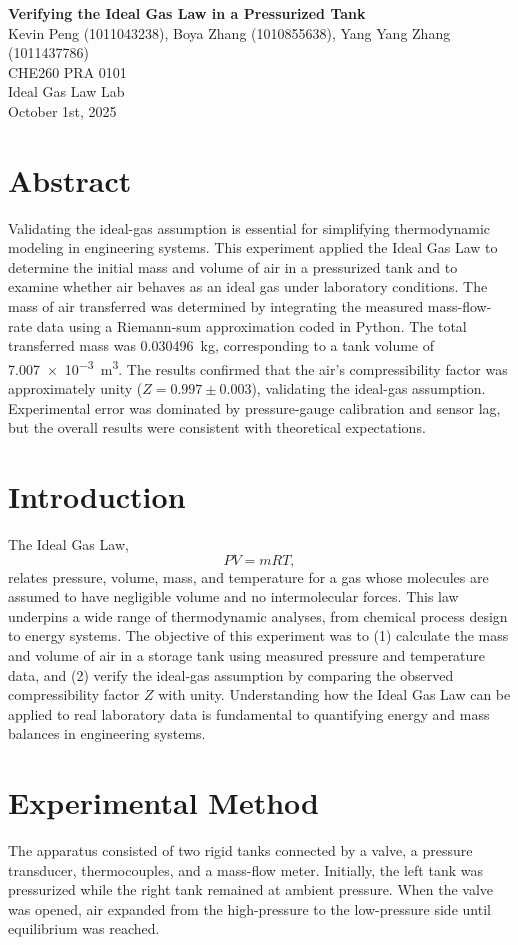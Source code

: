 \documentclass[12pt]{article}
\begin{document}
\begin{center}
\textbf{\Large Verifying the Ideal Gas Law in a Pressurized Tank} \\[0.5em]
Kevin Peng (1011043238), Boya Zhang (1010855638), Yang Yang Zhang (1011437786)\\[0.5em]
CHE260 PRA 0101 \\
Ideal Gas Law Lab \\
October 1st, 2025 \\
\end{center}

\section*{Abstract}
Validating the ideal-gas assumption is essential for simplifying thermodynamic modeling in engineering systems.
This experiment applied the Ideal Gas Law to determine the initial mass and volume of air in a pressurized tank and to examine whether air behaves as an ideal gas under laboratory conditions. The mass of air transferred was determined by integrating the measured mass-flow-rate data using a Riemann-sum approximation coded in Python. The total transferred mass was \SI{0.030496}{\kilogram}, corresponding to a tank volume of \SI{7.007e-3}{\metre\cubed}. The results confirmed that the air’s compressibility factor was approximately unity (\(Z = 0.997 \pm 0.003\)), validating the ideal-gas assumption. Experimental error was dominated by pressure-gauge calibration and sensor lag, but the overall results were consistent with theoretical expectations.

\section*{Introduction}
The Ideal Gas Law,
\[
PV = m R T,
\]
relates pressure, volume, mass, and temperature for a gas whose molecules are assumed to have negligible volume and no intermolecular forces. This law underpins a wide range of thermodynamic analyses, from chemical process design to energy systems. The objective of this experiment was to (1) calculate the mass and volume of air in a storage tank using measured pressure and temperature data, and (2) verify the ideal-gas assumption by comparing the observed compressibility factor \(Z\) with unity. Understanding how the Ideal Gas Law can be applied to real laboratory data is fundamental to quantifying energy and mass balances in engineering systems.

\section*{Experimental Method}
The apparatus consisted of two rigid tanks connected by a valve, a pressure transducer, thermocouples, and a mass-flow meter. Initially, the left tank was pressurized while the right tank remained at ambient pressure. When the valve was opened, air expanded from the high-pressure to the low-pressure side until equilibrium was reached.
\end{document}
